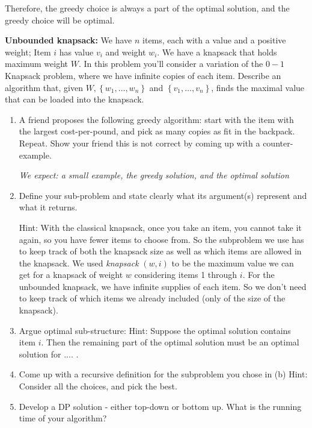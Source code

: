 \documentclass{report}
\begin{document}
\begin{enumerate}
\begin{enumerate}
      Therefore, the greedy choice is always a part of the optimal solution, and the greedy choice will be optimal. \\

    \end{enumerate}

  \end{enumerate}


\newpage
    \qs {} {
\textbf{Unbounded knapsack:} We have $n$ items, each with a value and a positive weight; Item $i$ has value $v_i$ and weight $w_i$. We have a knapsack that holds maximum weight $W$. In this problem you'll consider a variation of the $0-1$ Knapsack problem, where we have infinite copies of each item. Describe an algorithm that, given $W,\left\{w_1, \ldots, w_n\right\}$ and $\left\{v_1, \ldots, v_n\right\}$, finds the maximal value that can be loaded into the knapsack.

  \begin{enumerate}
    \item A friend proposes the following greedy algorithm: start with the item with the largest cost-per-pound, and pick as many copies as fit in the backpack. Repeat.
Show your friend this is not correct by coming up with a counter-example.

    \textit{We expect: a small example, the greedy solution, and the optimal solution}
    \item Define your sub-problem and state clearly what its argument(s) represent and what it returns.

      Hint: With the classical knapsack, once you take an item, you cannot take it again, so you have fewer items to choose from. So the subproblem we use has to keep track of both the knapsack size as well as which items are allowed in the knapsack. We used \emph{knapsack} $(w, i)$ to be the maximum value we can get for a knapsack of weight $w$ considering items 1 through $i$. For the unbounded knapsack, we have infinite supplies of each item. So we don't need to keep track of which items we already included (only of the size of the knapsack).

    \item Argue optimal sub-structure:
      Hint: Suppose the optimal solution contains item $i$. Then the remaining part of the optimal solution must be an optimal solution for .... .

    \item Come up with a recursive definition for the subproblem you chose in (b)
    Hint: Consider all the choices, and pick the best.

  \item Develop a DP solution - either top-down or bottom up. What is the running time of your algorithm?

  \end{enumerate}
    }
\end{document}
